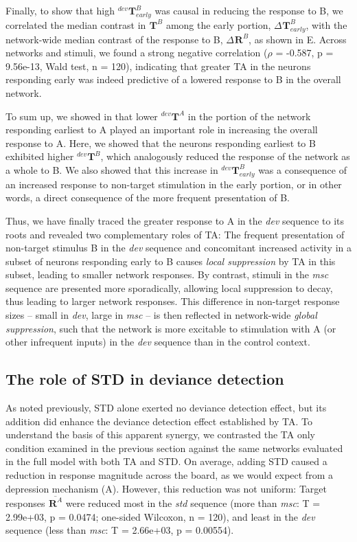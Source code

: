 \documentclass[9pt,lineno,onehalfspacing]{elife}
\newcommand{\dev}{\textit{dev}}
\newcommand{\msc}{\textit{msc}}
\newcommand{\std}{\textit{std}}
\newcommand{\R}[3][]{{}^{#1}_{}\boldsymbol R^{#2}_{#3}}
\newcommand{\T}[3][]{{}^{#1}_{}\boldsymbol T^{#2}_{#3}}
\newcommand{\mean}[1]{\overline{#1}}
\begin{document}
Finally, to show that high $\T[dev]{B}{early}$ was causal in reducing the response to B, we correlated the median contrast in $\T{B}{}$ among the early portion, $\Delta \T{B}{early}$, with the network-wide median contrast of the response to B, $\Delta \R{B}{}$, as shown in E. Across networks and stimuli, we found a strong negative correlation ($\rho$ = -0.587, p = 9.56e-13, Wald test, n = 120), indicating that greater TA in the neurons responding early was indeed predictive of a lowered response to B in the overall network.

To sum up, we showed in  that lower $\T[dev]{A}{}$ in the portion of the network responding earliest to A played an important role in increasing the overall response to A. Here, we showed that the neurons responding earliest to B exhibited higher $\T[dev]{B}{}$, which analogously reduced the response of the network as a whole to B. We also showed that this increase in $\T[dev]{B}{early}$ was a consequence of an increased response to non-target stimulation in the early portion, or in other words, a direct consequence of the more frequent presentation of B.

Thus, we have finally traced the greater response to A in the \dev{} sequence to its roots and revealed two complementary roles of TA: The frequent presentation of non-target stimulus B in the \dev{} sequence and concomitant increased activity in a subset of neurons responding early to B causes \emph{local suppression} by TA in this subset, leading to smaller network responses. By contrast, stimuli in the \msc{} sequence are presented more sporadically, allowing local suppression to decay, thus leading to larger network responses. This difference in non-target response sizes -- small in \dev{}, large in \msc{} -- is then reflected in network-wide \emph{global suppression}, such that the network is more excitable to stimulation with A (or other infrequent inputs) in the \dev{} sequence than in the control context.

\subsection{The role of STD in deviance detection}\label{sec:std}

As noted previously, STD alone exerted no deviance detection effect, but its addition did enhance the deviance detection effect established by TA. To understand the basis of this apparent synergy, we contrasted the TA only condition examined in the previous section against the same networks evaluated in the full model with both TA and STD. On average, adding STD caused a reduction in response magnitude across the board, as we would expect from a depression mechanism (A). However, this reduction was not uniform: Target responses $\mean{\R{A}{}}$ were reduced most in the \std{} sequence (more than \msc{}: T = 2.99e+03, p = 0.0474; one-sided Wilcoxon, n = 120), and least in the \dev{} sequence (less than \msc{}: T = 2.66e+03, p = 0.00554).
\end{document}
